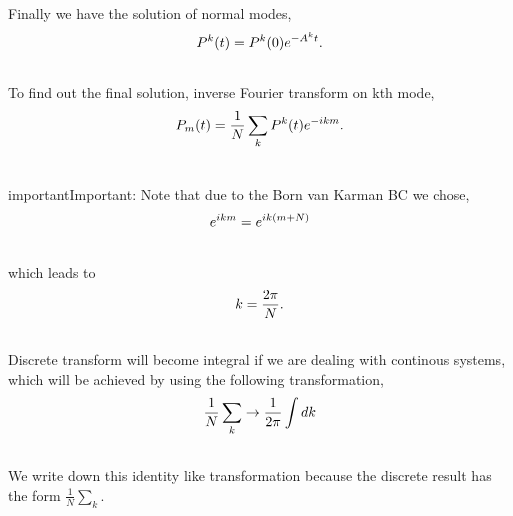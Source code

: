 \documentclass[letterpaper,10pt,english]{sphinxmanual}
\begin{document}
Finally we have the solution of normal modes,
\begin{gather}
\begin{split}P^k(t) = P^k(0) e^{-A^k t} .\end{split}\notag\\\begin{split}\end{split}\notag
\end{gather}
To find out the final solution, inverse Fourier transform on kth mode,
\begin{gather}
\begin{split}P_m(t) = \frac{1}{N} \sum_k P^k(t) e^{-ikm} .\end{split}\notag\\\begin{split}\end{split}\notag
\end{gather}
\begin{notice}{important}{Important:}
Note that due to the Born van Karman BC we chose,
\begin{gather}
\begin{split}e^{ikm} = e^{ik(m+N)}\end{split}\notag\\\begin{split}\end{split}\notag
\end{gather}
which leads to
\begin{gather}
\begin{split}k=\frac{2\pi}{N} .\end{split}\notag\\\begin{split}\end{split}\notag
\end{gather}
Discrete transform will become integral if we are dealing with continous systems, which will be achieved by using the following transformation,
\begin{gather}
\begin{split}\frac{1}{N}\sum_k  \rightarrow \frac{1}{2\pi} \int dk\end{split}\notag\\\begin{split}\end{split}\notag
\end{gather}
We write down this identity like transformation because the discrete result has the form $\frac{1}{N}\sum_k$.
\end{notice}
\end{document}
